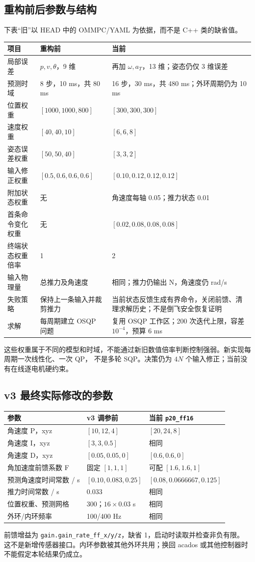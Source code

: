 \documentclass[UTF8,a4paper,11pt,fontset=fandol]{ctexart}
\newcommand{\code}[1]{{\small\nolinkurl{#1}}}
\begin{document}
\subsection{重构前后参数与结构}
下表“旧”以 HEAD 中的 OMMPC/YAML 为依据，而不是 C++ 类的缺省值。
\begin{longtable}{L{3.9cm}L{5.0cm}L{6.3cm}}
\toprule 项目 & 重构前 & 当前\\\midrule\endhead
局部误差 & $p,v,\theta$，9 维 & 再加 $\omega,a_T$，13 维；姿态仍仅 3 维误差\\
预测时域 & 8 步，10 ms，共 80 ms & 16 步，30 ms，共 480 ms；外环周期仍为 10 ms\\
位置权重 & $[1000,1000,800]$ & $[300,300,300]$\\
速度权重 & $[40,40,10]$ & $[6,6,8]$\\
姿态误差权重 & $[50,50,40]$ & $[3,3,2]$\\
输入修正权重 & $[0.5,0.6,0.6,0.6]$ & $[0.10,0.12,0.12,0.12]$\\
附加状态权重 & 无 & 角速度每轴 0.05；推力状态 0.01\\
首条命令变化权重 & 无 & $[0.02,0.08,0.08,0.08]$\\
终端状态权重倍率 & 1 & 2\\
输入物理量 & 总推力及角速度 & 相同；推力仍输出 N，角速度仍 rad/s\\
失败策略 & 保持上一条输入并裁剪推力 & 当前状态反馈生成有界命令，关闭前馈、清理求解历史；不是倒飞安全恢复证明\\
求解 & 每周期建立 OSQP 问题 & 复用 OSQP 工作区；200 次迭代上限，容差 $10^{-4}$，预算 6 ms\\
\bottomrule
\end{longtable}
这些权重属于不同的模型和时域，不能通过新旧数值倍率判断控制强弱。新实现每周期一次线性化、一次 QP，
不是多轮 SQP。决策仍为 $4N$ 个输入修正；当前没有在线逐电机硬约束。

\subsection{v3 最终实际修改的参数}
\begin{center}\begin{tabular}{lll}\toprule
参数 & v3 调参前 & 当前 \code{p20_ff16}\\\midrule
角速度 P，xyz & $[10,12,4]$ & $[20,24,8]$\\
角速度 I，xyz & $[3,3,0.5]$ & 相同\\
角速度 D，xyz & $[0.05,0.05,0]$ & $[0.6,0.6,0]$\\
角加速度前馈系数 F & 固定 $[1,1,1]$ & 可配 $[1.6,1.6,1]$\\
预测角速度时间常数 / s & $[0.10,0.083,0.25]$ & $[0.08,0.0666667,0.125]$\\
推力时间常数 / s & 0.033 & 相同\\
位置权重、预测网格 & 300；$16\times0.03$ s & 相同\\
外环/内环频率 & 100/400 Hz & 相同\\\bottomrule
\end{tabular}\end{center}
前馈增益为 \code{gain.gain_rate_ff_x/y/z}，缺省 1，启动时读取并检查非负有限。
这不是新增传感器接口。内环参数被其他外环共用；换回 acados 或其他控制器时不能假定本轮结果仍成立。
\end{document}
